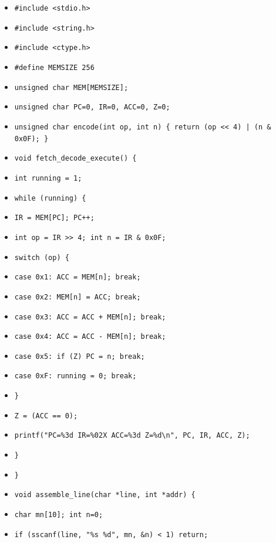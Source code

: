 \documentclass[11pt]{article}
\begin{document}
\begin{exemplebox}
\begin{itemize}
\item \texttt{\#include <stdio.h>}
\item \texttt{\#include <string.h>}
\item \texttt{\#include <ctype.h>}
\item \texttt{\#define MEMSIZE 256}
\item \texttt{unsigned char MEM[MEMSIZE];}
\item \texttt{unsigned char PC=0, IR=0, ACC=0, Z=0;}
\item \texttt{unsigned char encode(int op, int n) \{ return (op << 4) | (n \& 0x0F); \}}
\item \texttt{void fetch\_decode\_execute() \{}
\item \texttt{\quad int running = 1;}
\item \texttt{\quad while (running) \{}
\item \texttt{\quad\quad IR = MEM[PC]; PC++;}
\item \texttt{\quad\quad int op = IR >> 4; int n = IR \& 0x0F;}
\item \texttt{\quad\quad switch (op) \{}
\item \texttt{\quad\quad\quad case 0x1: ACC = MEM[n]; break;}
\item \texttt{\quad\quad\quad case 0x2: MEM[n] = ACC; break;}
\item \texttt{\quad\quad\quad case 0x3: ACC = ACC + MEM[n]; break;}
\item \texttt{\quad\quad\quad case 0x4: ACC = ACC - MEM[n]; break;}
\item \texttt{\quad\quad\quad case 0x5: if (Z) PC = n; break;}
\item \texttt{\quad\quad\quad case 0xF: running = 0; break;}
\item \texttt{\quad\quad \}}
\item \texttt{\quad\quad Z = (ACC == 0);}
\item \texttt{\quad\quad printf("PC=\%3d IR=\%02X ACC=\%3d Z=\%d\textbackslash n", PC, IR, ACC, Z);}
\item \texttt{\quad \}}
\item \texttt{\}}
\item \texttt{void assemble\_line(char *line, int *addr) \{}
\item \texttt{\quad char mn[10]; int n=0;}
\item \texttt{\quad if (sscanf(line, "\%s \%d", mn, \&n) < 1) return;}

\end{itemize}
\end{exemplebox}
\end{document}
